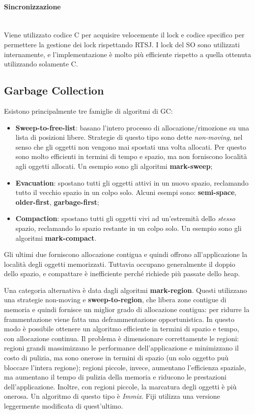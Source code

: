 \paragraph{Sincronizzazione} \mbox{} \\
Viene utilizzato codice C per acquisire velocemente il lock e codice specifico per permettere la gestione dei lock rispettando RTSJ. I lock del SO sono utilizzati internamente, e l'implementazione è molto più efficiente rispetto a quella ottenuta utilizzando solamente C.

\subsection{Garbage Collection} \label{sec:gc}
Esistono principalmente tre famiglie di algoritmi di GC:
\begin{itemize}
	\item \textbf{Sweep-to-free-list}: basano l'intero processo di allocazione/rimozione su una lista di posizioni libere. Strategie di questo tipo sono dette \textit{non-moving}, nel senso che gli oggetti non vengono mai spostati una volta allocati. Per questo sono molto efficienti in termini di tempo e spazio, ma non forniscono località agli oggetti allocati. Un esempio sono gli algoritmi \textbf{mark-sweep};
	\item \textbf{Evacuation}: spostano tutti gli oggetti attivi in un nuovo spazio, reclamando tutto il vecchio spazio in un colpo solo. Alcuni esempi sono: \textbf{semi-space}, \textbf{older-first}, \textbf{garbage-first};
	\item \textbf{Compaction}: spostano tutti gli oggetti vivi ad un'estremità dello \textit{stesso} spazio, reclamando lo spazio restante in un colpo solo. Un esempio sono gli algoritmi \textbf{mark-compact}.
\end{itemize}
Gli ultimi due forniscono allocazione contigua e quindi offrono all'applicazione la località degli oggetti memorizzati. Tuttavia occupano generalmente il doppio dello spazio, e compattare è inefficiente perché richiede più passate dello heap.

Una categoria alternativa è data dagli algoritmi \textbf{mark-region}. Questi utilizzano una strategie non-moving e \textbf{sweep-to-region}, che libera zone contigue di memoria e quindi fornisce un miglior grado di allocazione contigua: per ridurre la frammentazione viene fatta una deframmentazione opportunistica. In questo modo è possibile ottenere un algoritmo efficiente in termini di spazio e tempo, con allocazione continua. Il problema è dimensionare correttamente le regioni: regioni grandi massimizzano le performance dell'applicazione e minimizzano il costo di pulizia, ma sono onerose in termini di spazio (un solo oggetto puù bloccare l'intera regione); regioni piccole, invece, aumentano l'efficienza spaziale, ma aumentano il tempo di pulizia della memoria e riducono le prestazioni dell'applicazione. Inoltre, con regioni piccole, la marcatura degli oggetti è più onerosa. Un algoritmo di questo tipo è \textit{Immix}. Fiji utilizza una versione leggermente modificata di quest'ultimo.

